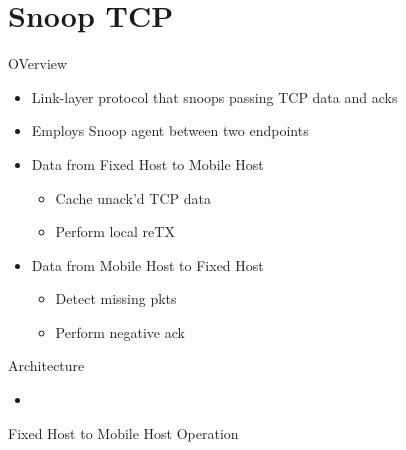 \documentclass[a4paper]{article}
\begin{document}
\section{Snoop TCP}
OVerview
\begin{itemize}
	\item Link-layer protocol that snoops passing TCP data and acks
	\item Employs Snoop agent between two endpoints
	\item Data from Fixed Host to Mobile Host
	\begin{itemize}
		\item Cache unack'd TCP data
		\item Perform local reTX
	\end{itemize}
	\item Data from Mobile Host to Fixed Host
	\begin{itemize}
		\item Detect missing pkts
		\item Perform negative ack
	\end{itemize}
\end{itemize}
Architecture
\begin{itemize}
	\item
\end{itemize}
Fixed Host to Mobile Host Operation
\end{document}
